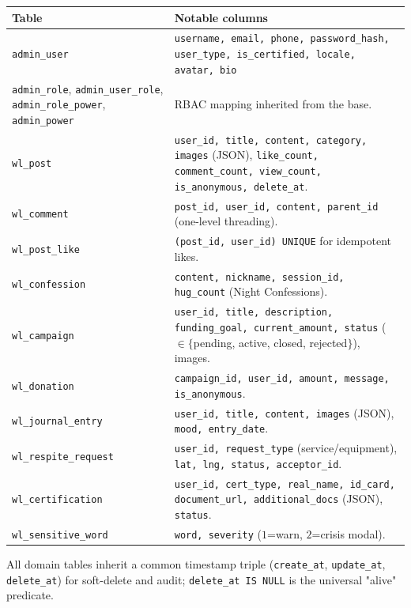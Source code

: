 \begin{tabularx}{\linewidth}{@{} L{3.4cm} X @{}}
  \toprule
  \textbf{Table} & \textbf{Notable columns} \\
  \midrule
  \texttt{admin\_user}
    & \texttt{username, email, phone, password\_hash, user\_type,
       is\_certified, locale, avatar, bio} \\
  \texttt{admin\_role}, \texttt{admin\_user\_role},
  \texttt{admin\_role\_power}, \texttt{admin\_power}
    & RBAC mapping inherited from the base. \\
  \texttt{wl\_post}
    & \texttt{user\_id, title, content, category, images} (JSON),
      \texttt{like\_count, comment\_count, view\_count, is\_anonymous,
      delete\_at}. \\
  \texttt{wl\_comment}
    & \texttt{post\_id, user\_id, content, parent\_id} (one-level
      threading). \\
  \texttt{wl\_post\_like}
    & \texttt{(post\_id, user\_id) UNIQUE} for idempotent likes. \\
  \texttt{wl\_confession}
    & \texttt{content, nickname, session\_id, hug\_count} (Night
      Confessions). \\
  \texttt{wl\_campaign}
    & \texttt{user\_id, title, description, funding\_goal,
      current\_amount, status} ($\in \{$pending, active, closed,
      rejected$\}$), images. \\
  \texttt{wl\_donation}
    & \texttt{campaign\_id, user\_id, amount, message, is\_anonymous}. \\
  \texttt{wl\_journal\_entry}
    & \texttt{user\_id, title, content, images} (JSON),
      \texttt{mood, entry\_date}. \\
  \texttt{wl\_respite\_request}
    & \texttt{user\_id, request\_type} (service/equipment),
      \texttt{lat, lng, status, acceptor\_id}. \\
  \texttt{wl\_certification}
    & \texttt{user\_id, cert\_type, real\_name, id\_card,
      document\_url, additional\_docs} (JSON), \texttt{status}. \\
  \texttt{wl\_sensitive\_word}
    & \texttt{word, severity} ($1$=warn, $2$=crisis modal). \\
  \bottomrule
\end{tabularx}

\smallskip
All domain tables inherit a common timestamp triple
(\texttt{create\_at}, \texttt{update\_at}, \texttt{delete\_at}) for
soft-delete and audit; \texttt{delete\_at IS NULL} is the universal
"alive" predicate.

